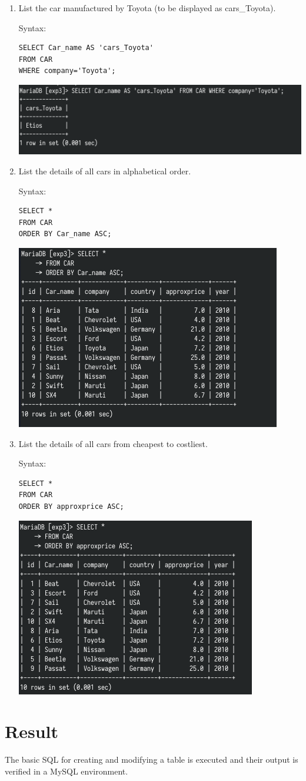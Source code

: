 \documentclass[13pt,oneside]{book}
\begin{document}
\begin{enumerate}
\item
List the car manufactured by Toyota (to be displayed as cars\_Toyota).
 
Syntax:
\begin{verbatim}
SELECT Car_name AS 'cars_Toyota'
FROM CAR
WHERE company='Toyota';

\end{verbatim}
\includegraphics[]{img/p3/ss11.png}


\item
List the details of all cars in alphabetical order.
 
Syntax:
\begin{verbatim}
SELECT *
FROM CAR
ORDER BY Car_name ASC;

\end{verbatim}
\includegraphics[]{img/p3/ss12.png}


\item
List the details of all cars from cheapest to costliest.

Syntax:
\begin{verbatim}
SELECT *
FROM CAR
ORDER BY approxprice ASC;

\end{verbatim}
\includegraphics[]{img/p3/ss13.png}
	\end{enumerate}
	\section*{Result}
	The basic SQL for creating and modifying a table is executed and their output
	is verified in a MySQL environment.
\end{document}
